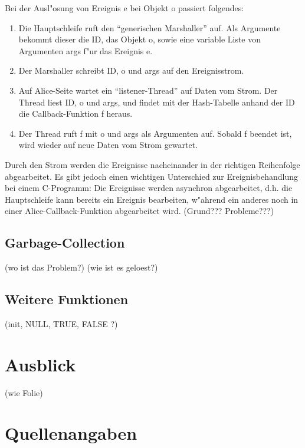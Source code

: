 \documentclass{article}
\begin{document}
Bei der Ausl"osung von Ereignis e bei Objekt o passiert folgendes:

\begin{enumerate}
\item Die Hauptschleife ruft den ``generischen Marshaller'' auf. Als Argumente
      bekommt dieser die ID, das Objekt o, sowie eine variable Liste von
      Argumenten args f"ur das Ereignis e.
\item Der Marshaller schreibt ID, o und args auf den Ereignisstrom.
\item Auf Alice-Seite wartet ein ``listener-Thread'' auf Daten vom Strom.
      Der Thread liest ID, o und args, und findet mit der Hash-Tabelle anhand
      der ID die Callback-Funktion f heraus.
\item Der Thread ruft f mit o und args als Argumenten auf. Sobald f beendet
      ist, wird wieder auf neue Daten vom Strom gewartet.
\end{enumerate}

Durch den Strom werden die Ereignisse nacheinander in der richtigen
Reihenfolge abgearbeitet. Es gibt jedoch einen wichtigen Unterschied
zur Ereignisbehandlung bei einem C-Programm: Die Ereignisse werden asynchron
abgearbeitet, d.h. die Hauptschleife kann bereits ein Ereignis bearbeiten,
w"ahrend ein anderes noch in einer Alice-Callback-Funktion abgearbeitet wird.
(Grund??? Probleme???)

\subsection{Garbage-Collection}

(wo ist das Problem?)
(wie ist es geloest?)

\subsection{Weitere Funktionen}

(init, NULL, TRUE, FALSE ?)

\section{Ausblick}

(wie Folie)

\section{Quellenangaben}
\end{document}
